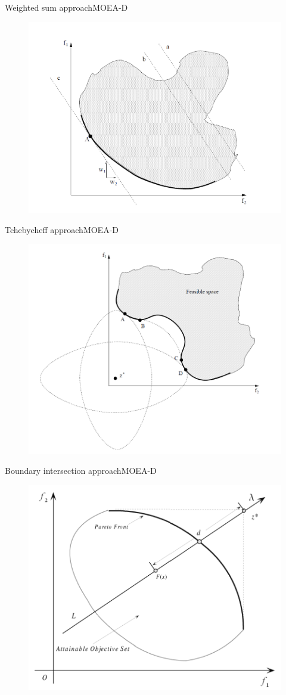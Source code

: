 \begin{frame}{Weighted sum approach}{MOEA-D}
	\begin{figure}
		\centering
		\includegraphics[width=.6\linewidth]{figure/weighted_sum}
		\label{fig:weighted_sum}
	\end{figure}
\end{frame}

\begin{frame}{Tchebycheff approach}{MOEA-D}
	\begin{figure}
		\centering
		\includegraphics[width=.6\linewidth]{figure/tchebycheff}
		\label{fig:tchebycheff}
	\end{figure}	
\end{frame}

\begin{frame}{Boundary intersection approach}{MOEA-D}
	\begin{figure}
		\centering
		\includegraphics[width=.6\linewidth]{figure/boundary_intersection}
		\label{fig:boundary_intersection}
	\end{figure}	
\end{frame}

